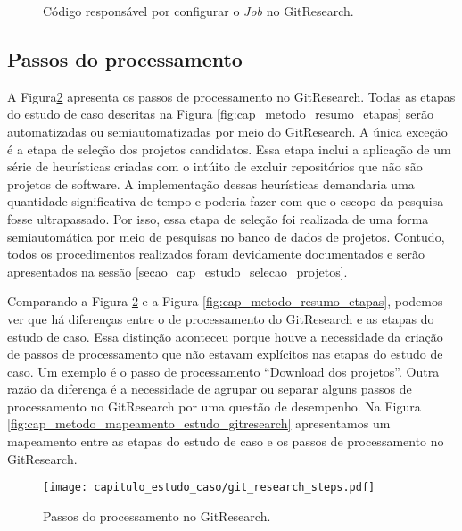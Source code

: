  \begin{figure}[H]
  \centering
  \caption{Código responsável por configurar o \textit{Job} no GitResearch.}
  \label{fig:configuracao_job} 
\end{figure}
 
 
 \subsection{Passos do processamento}
 
 A Figura\ref{fig:passos_gitresearch} apresenta os passos de processamento no GitResearch.  Todas as etapas do estudo de caso descritas na Figura \ref{fig:cap_metodo_resumo_etapas} serão automatizadas ou semiautomatizadas por meio do GitResearch. A única exceção é a etapa de seleção dos projetos candidatos. Essa etapa inclui a aplicação de um série de heurísticas criadas com o intúito de excluir repositórios que não são projetos de software. A implementação dessas heurísticas demandaria uma quantidade significativa de tempo e poderia fazer com que o escopo da pesquisa fosse ultrapassado. Por isso, essa etapa de seleção foi realizada de uma forma semiautomática por meio de pesquisas no banco de dados de projetos.  Contudo, todos os procedimentos realizados foram devidamente documentados e serão apresentados na sessão \ref{secao_cap_estudo_selecao_projetos}.
 
Comparando a Figura \ref{fig:passos_gitresearch} e a Figura \ref{fig:cap_metodo_resumo_etapas}, podemos ver que há diferenças entre o de processamento do GitResearch e as etapas do estudo de caso. Essa distinção aconteceu porque houve a necessidade da criação de passos de processamento que não estavam explícitos nas etapas do estudo de caso. Um exemplo é o passo de processamento ``Download dos projetos''. Outra razão da diferença é a necessidade de agrupar ou separar alguns passos de processamento no GitResearch por uma questão de desempenho.  Na Figura \ref{fig:cap_metodo_mapeamento_estudo_gitresearch} apresentamos um mapeamento entre as etapas do estudo de caso e os passos de processamento no GitResearch. 

 \begin{figure}[H]
  \centering
  \texttt{[image: capitulo\_estudo\_caso/git\_research\_steps.pdf]} 
  \caption{Passos do processamento no GitResearch.}
  \label{fig:passos_gitresearch} 
\end{figure}




